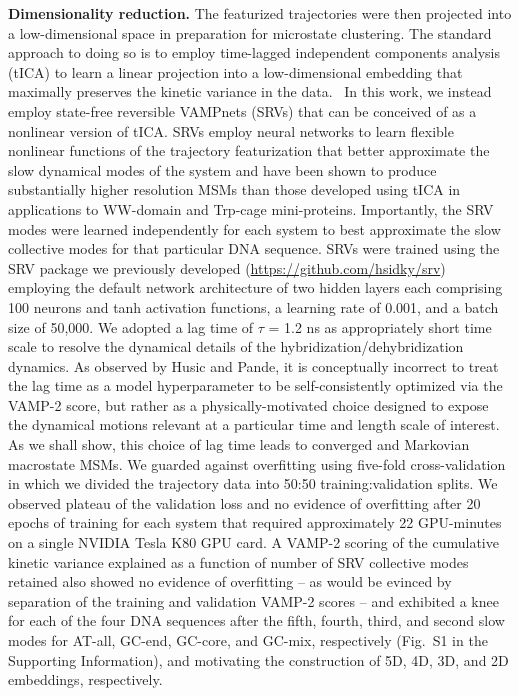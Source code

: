 \documentclass[journal=jpcbfk,manuscript=article]{achemso}
\newcommand*{\blauw}[1]{{#1}}
\begin{document}
\textbf{Dimensionality reduction.} The featurized trajectories were then projected into a low-dimensional space in preparation for microstate clustering. The standard approach to doing so is to employ time-lagged independent components analysis (tICA) to learn a linear projection into a low-dimensional embedding that maximally preserves the kinetic variance in the data.~\citep{Perez-Hernandez2013IdentificationConstruction, Schwantes2013ImprovementsNTL9, Noe2015KineticSimulation} In this work, we instead employ state-free reversible VAMPnets (SRVs) that can be conceived of as a nonlinear version of tICA. \citep{Chen} SRVs employ neural networks to learn flexible nonlinear functions of the trajectory featurization that better approximate the slow dynamical modes of the system and have been shown to produce substantially higher resolution MSMs than those developed using tICA in applications to WW-domain and Trp-cage mini-proteins.\citep{Chen, Sidky2019High-ResolutionVAMPnets} Importantly, the SRV modes were learned independently for each system to best approximate the slow collective modes for that particular DNA sequence. SRVs were trained using the SRV package we previously developed (\url{https://github.com/hsidky/srv}) employing the default network architecture of two hidden layers each comprising 100 neurons and tanh activation functions, a learning rate of 0.001, and a batch size of 50,000. We adopted a lag time of $\tau$ = 1.2 ns as appropriately short time scale to resolve the dynamical details of the hybridization/dehybridization dynamics. \citep{Phys2011MarkovValidation} As observed by Husic and Pande, it is conceptually incorrect to treat the lag time as a model hyperparameter to be self-consistently optimized via the VAMP-2 score, but rather as a physically-motivated choice designed to expose the dynamical motions relevant at a particular time and length scale of interest. \citep{Husic2017Note:Selection} As we shall show, this choice of lag time leads to converged and Markovian macrostate MSMs. We guarded against overfitting using five-fold cross-validation in which we divided the trajectory data into 50:50 training:validation splits. We observed plateau of the validation loss and no evidence of overfitting after 20 epochs of training for each system that required approximately 22 GPU-minutes on a single NVIDIA Tesla K80 GPU card. A VAMP-2 scoring of the cumulative kinetic variance explained as a function of number of SRV collective modes retained also showed no evidence of overfitting -- as would be evinced by separation of the training and validation VAMP-2 scores \citep{Sidky2019High-ResolutionVAMPnets} -- and exhibited a knee for each of the four DNA sequences after the fifth, fourth, third, and second slow modes for AT-all, GC-end, GC-core, and GC-mix, respectively (\blauw{Fig.~S1} in the \blauw{Supporting Information}), and motivating the construction of 5D, 4D, 3D, and 2D embeddings, respectively.
\end{document}
